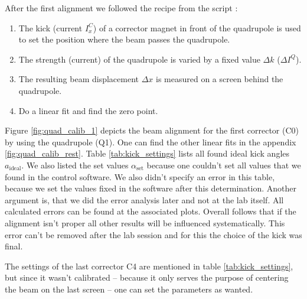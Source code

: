 \documentclass[11pt,a4paper,notitlepage]{scrartcl}
\begin{document}
After the first alignment we followed the recipe from the script \cite{script}:
\begin{enumerate}
	\item The kick  (current $I_x^C$) of a corrector magnet in front of the quadrupole is used to set the position where the beam passes the quadrupole.
	\item The strength (current) of the quadrupole is varied by a fixed value $\Delta k$ ($\Delta I^Q$).
	\item The resulting beam displacement $\Delta x$ is measured on a screen behind the quadrupole.
	\item Do a linear fit and find the zero point.
\end{enumerate}

Figure \ref{fig:quad_calib_1} depicts the beam alignment for the first corrector (C0) by using the quadrupole (Q1). One can find the other linear fits in the appendix \ref{fig:quad_calib_rest}. Table \ref{tab:kick_settings} lists all found ideal kick angles $a_\text{ideal}$. We also listed the set values $\alpha_\text{set}$ because one couldn't set all values that we found in the control software. We also didn't specify an error in this table, because we set the values fixed in the software after this determination. Another argument is, that we did the error analysis later and not at the lab itself. All calculated errors can be found at the associated plots. Overall follows that if the alignment isn't proper all other results will be influenced systematically. This error can't be removed after the lab session and for this the choice of the kick was final. 

The settings of the last corrector C4 are mentioned in table \ref{tab:kick_settings}, but since it wasn't calibrated -- because it only serves the purpose of centering the beam on the last screen -- one can set the parameters as wanted.
\end{document}
